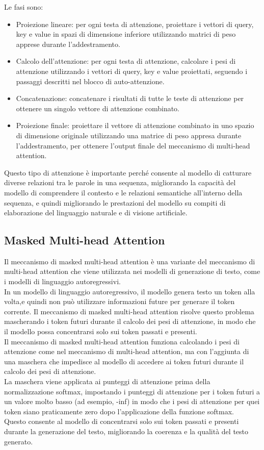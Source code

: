 Le fasi sono:
\begin{itemize}
    \item Proiezione lineare: per ogni testa di attenzione, proiettare i vettori di query, key e value in spazi di dimensione inferiore utilizzando matrici di peso apprese durante l'addestramento.
    \item Calcolo dell'attenzione: per ogni testa di attenzione, calcolare i pesi di attenzione utilizzando i vettori di query, key e value proiettati, seguendo i passaggi descritti nel blocco di auto-attenzione.
    \item Concatenazione: concatenare i risultati di tutte le teste di attenzione per ottenere un singolo vettore di attenzione combinato.
    \item Proiezione finale: proiettare il vettore di attenzione combinato in uno spazio di dimensione originale utilizzando una matrice di peso appresa durante l'addestramento, per ottenere l'output finale del meccanismo di multi-head attention.
\end{itemize}

Questo tipo di attenzione è importante perché consente al modello di catturare diverse relazioni tra le parole in una sequenza, migliorando la capacità del modello di comprendere il contesto e le relazioni semantiche all'interno della sequenza, 
e quindi migliorando le prestazioni del modello su compiti di elaborazione del linguaggio naturale e di visione artificiale.\\

\subsection{Masked Multi-head Attention}

Il meccanismo di masked multi-head attention è una variante del meccanismo di multi-head attention che viene utilizzata nei modelli di generazione di testo, come i modelli di linguaggio autoregressivi.\\
In un modello di linguaggio autoregressivo, il modello genera testo un token alla volta,e quindi non può utilizzare informazioni future per generare il token corrente. Il meccanismo di masked
multi-head attention risolve questo problema mascherando i token futuri durante il calcolo dei pesi di attenzione, in modo che il modello possa concentrarsi solo sui token passati e presenti.\\
Il meccanismo di masked multi-head attention funziona calcolando i pesi di attenzione come nel meccanismo di multi-head attention, ma con l'aggiunta di una maschera che impedisce al modello di accedere ai token futuri durante il calcolo dei pesi di attenzione.\\
La maschera viene applicata ai punteggi di attenzione prima della normalizzazione softmax, impostando i punteggi di attenzione per i token futuri a un valore molto basso (ad esempio, -inf) in modo che i pesi di attenzione per quei token siano praticamente zero dopo l'applicazione della funzione softmax.\\
Questo consente al modello di concentrarsi solo sui token passati e presenti durante la generazione del testo, migliorando la coerenza e la qualità del testo generato.\\

